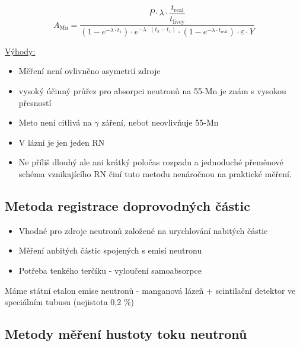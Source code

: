 \begin{equation}
    A_{\text{Mn}} = \dfrac{P\cdot \lambda \cdot \dfrac{t_{\text{real}}}{t_{\text{livey}}}}{(1 - e^{-\lambda \cdot t_1}) \cdot e^{-\lambda \cdot (t_2 - t_1)} \cdot (1 - e^{-\lambda \cdot t_{\text{real}}}) \cdot \varepsilon \cdot Y}
\end{equation}

\underline{Výhody:}

\begin{itemize}
    \item Měření není ovlivněno asymetrií zdroje
    \item vysoký účinný průřez pro absorpci neutronů na 55-Mn je znám s vysokou přesností
    \item Meto není citlivá na $\gamma$ záření, neboť neovlivňuje 55-Mn
    \item V lázni je jen jeden RN
    \item Ne příliš dlouhý ale ani krátký poločas rozpadu a jednoduché přeměnové schéma vznikajícího RN činí tuto metodu nenáročnou na praktické měření.
\end{itemize}

\subsection{Metoda registrace doprovodných částic}

\begin{itemize}
    \item Vhodné pro zdroje neutronů založené na urychlování nabitých částic
    \item Měření anbitých částic spojených s emisí neutronu
    \item Potřeba tenkého terčíku - vyloučení samoabsorpce
    
\end{itemize}

Máme státní etalon emise neutronů - manganová lázeň + scintilační detektor ve speciálním tubusu (nejistota 0,2 \%)

\subsection{Metody měření hustoty toku neutronů}

